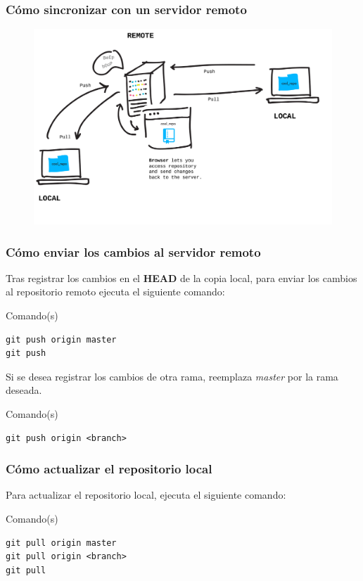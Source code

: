 \documentclass{beamer}
\begin{document}
\begin{frame}
\frametitle{Cómo sincronizar con un servidor remoto}
\begin{figure}
\includegraphics[width=0.95\linewidth]{img/remote.png}
\end{figure}
\end{frame}

\begin{frame}[fragile]
\frametitle{Cómo enviar los cambios al servidor remoto}
Tras registrar los cambios en el \textbf{HEAD} de la copia local, para enviar los cambios al repositorio remoto ejecuta el siguiente comando:
\begin{block}{Comando(s)}
\begin{verbatim}
git push origin master
git push
\end{verbatim}
\end{block}
\vskip 1.00cm
Si se desea registrar los cambios de otra rama, reemplaza \textit{master} por la rama deseada.
\begin{block}{Comando(s)}
\begin{verbatim}
git push origin <branch>
\end{verbatim}
\end{block}
\end{frame}

\begin{frame}[fragile]
\frametitle{Cómo actualizar el repositorio local}
Para actualizar el repositorio local, ejecuta el siguiente comando:
\begin{block}{Comando(s)}
\begin{verbatim}
git pull origin master
git pull origin <branch>
git pull
\end{verbatim}
\end{block}
\end{frame}
\end{document}
